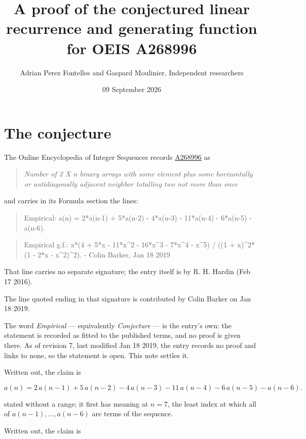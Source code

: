 \documentclass[11pt]{article}
\title{A proof of the conjectured linear recurrence and generating function for OEIS A268996}
\author{Adrian Perez Fontelles and Gaspard Moulinier, Independent researchers}
\date{09 September 2026}
\theoremstyle{definition}
\begin{document}
\maketitle
\section{The conjecture}

The Online Encyclopedia of Integer Sequences records \href{https://oeis.org/A268996}{A268996} as

\begin{quote}\itshape Number of 2 X n binary arrays with some element plus some horizontally or antidiagonally adjacent neighbor totalling two not more than once\end{quote}

and carries in its Formula section the lines:

\begin{quote}\ttfamily Empirical: a(n) = 2*a(n-1) + 5*a(n-2) - 4*a(n-3) - 11*a(n-4) - 6*a(n-5) - a(n-6).\end{quote}

\begin{quote}\ttfamily Empirical g.f.: x*(4 + 5*x - 11*x\textasciicircum{}2 - 16*x\textasciicircum{}3 - 7*x\textasciicircum{}4 - x\textasciicircum{}5) / ((1 + x)\textasciicircum{}2*(1 - 2*x - x\textasciicircum{}2)\textasciicircum{}2). - Colin Barker, Jan 18 2019\end{quote}

That line carries no separate signature; the entry itself is by R. H. Hardin (Feb 17 2016).

The line quoted ending in that signature is contributed by Colin Barker on Jan 18 2019.

The word {\itshape Empirical} --- equivalently {\itshape Conjecture} --- is the entry's own: the statement is recorded as fitted to the published terms, and no proof is given there. As of revision 7, last modified Jan 18 2019, the entry records no proof and links to none, so the statement is open. This note settles it.

Written out, the claim is

\[a(n) = 2\,a(n-1) + 5\,a(n-2) - 4\,a(n-3) - 11\,a(n-4) - 6\,a(n-5) - a(n-6).\]

stated without a range; it first has meaning at $n = 7$, the least index at which all of $a(n-1),\dots,a(n-6)$ are terms of the sequence.

Written out, the claim is
\end{document}
